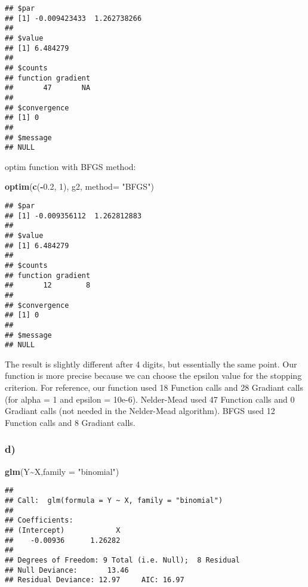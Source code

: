 \documentclass[
]{article}
\newenvironment{Shaded}{\begin{snugshade}}{\end{snugshade}}
\newcommand{\AttributeTok}[1]{\textcolor[rgb]{0.13,0.29,0.53}{#1}}
\newcommand{\DecValTok}[1]{\textcolor[rgb]{0.00,0.00,0.81}{#1}}
\newcommand{\FloatTok}[1]{\textcolor[rgb]{0.00,0.00,0.81}{#1}}
\newcommand{\FunctionTok}[1]{\textcolor[rgb]{0.13,0.29,0.53}{\textbf{#1}}}
\newcommand{\NormalTok}[1]{#1}
\newcommand{\SpecialCharTok}[1]{\textcolor[rgb]{0.81,0.36,0.00}{\textbf{#1}}}
\newcommand{\StringTok}[1]{\textcolor[rgb]{0.31,0.60,0.02}{#1}}
\begin{document}
\begin{verbatim}
## $par
## [1] -0.009423433  1.262738266
## 
## $value
## [1] 6.484279
## 
## $counts
## function gradient 
##       47       NA 
## 
## $convergence
## [1] 0
## 
## $message
## NULL
\end{verbatim}

optim function with BFGS method:

\begin{Shaded}
\begin{Highlighting}[]
\FunctionTok{optim}\NormalTok{(}\FunctionTok{c}\NormalTok{(}\SpecialCharTok{{-}}\FloatTok{0.2}\NormalTok{, }\DecValTok{1}\NormalTok{), g2, }\AttributeTok{method=} \StringTok{"BFGS"}\NormalTok{)}
\end{Highlighting}
\end{Shaded}

\begin{verbatim}
## $par
## [1] -0.009356112  1.262812883
## 
## $value
## [1] 6.484279
## 
## $counts
## function gradient 
##       12        8 
## 
## $convergence
## [1] 0
## 
## $message
## NULL
\end{verbatim}

The result is slightly different after 4 digits, but essentially the
same point. Our function is more precise because we can choose the
epsilon value for the stopping criterion. For reference, our function
used 18 Function calls and 28 Gradiant calls (for alpha = 1 and epsilon
= 10e-6). Nelder-Mead used 47 Function calls and 0 Gradiant calls (not
needed in the Nelder-Mead algorithm). BFGS used 12 Function calls and 8
Gradiant calls.

\hypertarget{d-1}{%
\subsubsection{d)}\label{d-1}}

\begin{Shaded}
\begin{Highlighting}[]
\FunctionTok{glm}\NormalTok{(Y}\SpecialCharTok{\textasciitilde{}}\NormalTok{X,}\AttributeTok{family =} \StringTok{"binomial"}\NormalTok{)}
\end{Highlighting}
\end{Shaded}

\begin{verbatim}
## 
## Call:  glm(formula = Y ~ X, family = "binomial")
## 
## Coefficients:
## (Intercept)            X  
##    -0.00936      1.26282  
## 
## Degrees of Freedom: 9 Total (i.e. Null);  8 Residual
## Null Deviance:       13.46 
## Residual Deviance: 12.97     AIC: 16.97
\end{verbatim}
\end{document}
